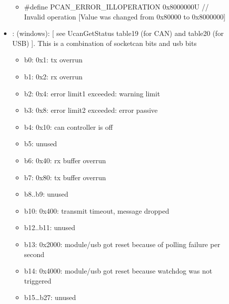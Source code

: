 \documentclass[a4paper,10pt,english]{sphinxmanual}
\begin{document}
\begin{fulllineitems}
\begin{fulllineitems}
\begin{description}
\begin{itemize}
\begin{itemize}
\item {} 
\#define PCAN\_ERROR\_ILLOPERATION 0x8000000U // Invalid operation {[}Value was changed from 0x80000 to 0x8000000{]}

\end{itemize}


\item {} 
: (windows): {[} see UcanGetStatus table19 (for CAN) and table20 (for USB) {]}. This is a combination of socketcan bits and usb bits\begin{itemize}
\item {} 
b0: 0x1: tx overrun

\item {} 
b1: 0x2: rx overrun

\item {} 
b2: 0x4: error limit1 exceeded: warning limit

\item {} 
b3: 0x8: error limit2 exceeded: error passive

\item {} 
b4: 0x10: can controller is off

\item {} 
b5: unused

\item {} 
b6: 0x40: rx buffer overrun

\item {} 
b7: 0x80: tx buffer overrun

\item {} 
b8..b9: unused

\item {} 
b10: 0x400: transmit timeout, message dropped

\item {} 
b12..b11: unused

\item {} 
b13: 0x2000: module/usb got reset because of polling failure per second

\item {} 
b14: 0x4000: module/usb got reset because watchdog was not triggered

\item {} 
b15…b27: unused 

\end{itemize}


\end{itemize}

\end{description}


\end{fulllineitems}


\end{fulllineitems}
\end{document}
